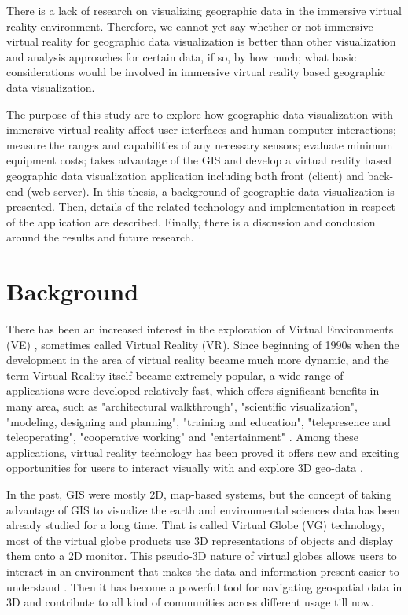 There is a lack of research on visualizing geographic data in the immersive virtual reality environment. Therefore, we cannot yet say whether or not immersive virtual reality for geographic data visualization is better than other visualization and analysis approaches for certain data, if so, by how much; what basic considerations would be involved in immersive virtual reality based geographic data visualization. 

The purpose of this study are to explore how geographic data visualization with immersive virtual reality affect user interfaces and human-computer interactions; measure the ranges and capabilities of any necessary sensors; evaluate minimum equipment costs; takes advantage of the GIS and develop a virtual reality based geographic data visualization application including both front (client) and back-end (web server). In this thesis, a background of geographic data visualization is presented.  Then, details of the related technology and implementation in respect of the application are described. Finally, there is a discussion and conclusion around the results and future research.

\section{Background}
\label{section:background}

There has been an increased interest in the exploration of Virtual Environments (VE) \cite{huang.java-cgi-vr.2002}, sometimes called Virtual Reality (VR). Since beginning of 1990s when the development in the area of virtual reality became much more dynamic, and the term Virtual Reality itself became extremely popular, a wide range of applications were developed relatively fast, which offers significant benefits in many area, such as "architectural walkthrough", "scientific visualization", "modeling, designing and planning", "training and education", "telepresence and teleoperating", "cooperative working" and "entertainment" \cite{mazuryk.vr.1996}. Among these applications, virtual reality technology has been proved it offers new and exciting opportunities for users to interact visually with and explore 3D geo-data \cite{huang.java-cgi-vr.2002}.

In the past, GIS were mostly 2D, map-based systems, but the concept of taking advantage of GIS to visualize the earth and environmental sciences data has been already studied for a long time. That is called Virtual Globe (VG) technology, most of the virtual globe products use 3D representations of objects and display them onto a 2D monitor. This pseudo-3D nature of virtual globes allows users to interact in an environment that makes the data and information present easier to understand \cite{tuttle.virtual-globes.2008}. Then it has become a powerful tool for navigating geospatial data in 3D and contribute to all kind of communities across different usage till now. 

